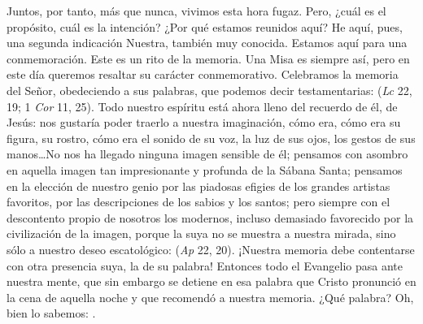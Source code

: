 \begin{body}
Juntos, por tanto, más que nunca, vivimos esta hora fugaz. Pero, ¿cuál es el propósito, cuál es la intención? ¿Por qué estamos reunidos aquí? He aquí, pues, una segunda indicación Nuestra, también muy conocida. Estamos aquí para una conmemoración. Este es un rito de la memoria. Una Misa es siempre así, pero en este día queremos resaltar su carácter conmemorativo. Celebramos la memoria del Señor, obedeciendo a sus palabras, que podemos decir testamentarias:  (\textit{Lc} 22, 19; 1 \textit{Cor} 11, 25). Todo nuestro espíritu está ahora lleno del recuerdo de él, de Jesús: nos gustaría poder traerlo a nuestra imaginación, cómo era, cómo era su figura, su rostro, cómo era el sonido de su voz, la luz de sus ojos, los gestos de sus manos\ldots No nos ha llegado ninguna imagen sensible de él; pensamos con asombro en aquella imagen tan impresionante y profunda de la Sábana Santa; pensamos en la elección de nuestro genio por las piadosas efigies de los grandes artistas favoritos, por las descripciones de los sabios y los santos; pero siempre con el descontento propio de nosotros los modernos, incluso demasiado favorecido por la civilización de la imagen, porque la suya no se muestra a nuestra mirada, sino sólo a nuestro deseo escatológico:  (\textit{Ap} 22, 20). ¡Nuestra memoria debe contentarse con otra presencia suya, la de su palabra! Entonces todo el Evangelio pasa ante nuestra mente, que sin embargo se detiene en esa palabra que Cristo pronunció en la cena de aquella noche y que recomendó a nuestra memoria. ¿Qué palabra? Oh, bien lo sabemos: . 
\end{body}


